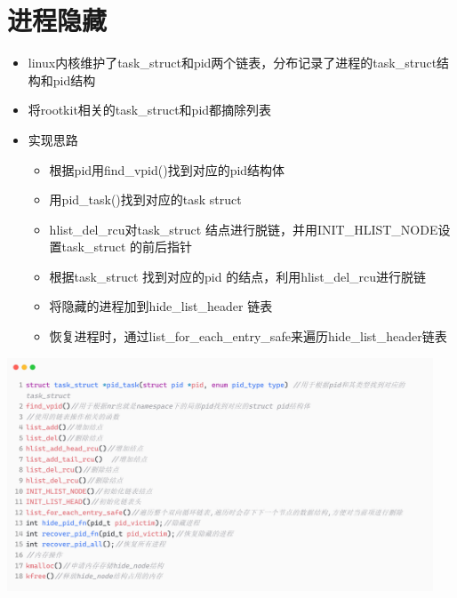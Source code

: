 \documentclass[11pt]{beamer}
\begin{document}
\section{进程隐藏}
\begin{frame}
	\begin{itemize}
		\item linux内核维护了task\_struct和pid两个链表，分布记录了进程的task\_struct结构和pid结构
		\item 将rootkit相关的task\_struct和pid都摘除列表
		\item 实现思路
		\begin{itemize}
			\item 根据pid用find\_vpid()找到对应的pid结构体
			\item 用pid\_task()找到对应的task struct
			\item hlist\_del\_rcu对task\_struct 结点进行脱链，并用INIT\_HLIST\_NODE设置task\_struct 的前后指针
			\item 根据task\_struct 找到对应的pid 的结点，利用hlist\_del\_rcu进行脱链
			\item 将隐藏的进程加到hide\_list\_header 链表
			\item 恢复进程时，通过list\_for\_each\_entry\_safe来遍历hide\_list\_header链表
		\end{itemize}
	\end{itemize}
\end{frame}

\begin{frame}
	\begin{itemize}
		\centering
		\includegraphics[width=0.95\textwidth]{pic/pid.png}
	\end{itemize}
\end{frame}


\end{document}
